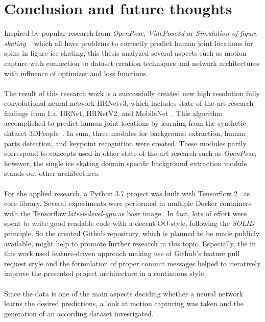 \chapter{Conclusion and future thoughts}
\label{conclusion}
Inspired by popular research from \textit{OpenPose, VidePose3d} or \textit{Simulation of figure skating} ~\cite{openpose, videopose3d, figureskatingsimulation}
which all have problems to correctly predict human joint locations for spins in figure ice skating, this thesis analyzed
several aspects such as motion capture with connection to dataset creation techniques and network architectures with influence of optimizer and loss functions.
\\\mbox{}\\
The result of this research work is a successfully created new high resolution fully convolutional neural network
HRNetv3, which includes state-of-the-art
research findings from I.a. HRNet, HRNetV2, and MobileNet~\cite{HRNetv1, HRNetv2, mobilenet}.
This algorithm accomplished to predict human joint locations by learning from the synthetic dataset
3DPeople~\cite{3dpeople}.
In sum, three modules for background extraction, human parts detection, and keypoint recognition were created.
These modules partly correspond to concepts used in other state-of-the-art research such as \textit{OpenPose},
however, the
single ice skating domain specific background extraction module stands out other architectures.
\\\mbox{}\\
For the applied research, a Python 3.7 project was built with Tensorflow 2~\cite{tensorflow2} as core library.
Several experiments were performed in multiple Docker containers with the Tensorflow:\textit{latest-devel-gpu} as base
image~\cite{tensorflowdocker}
In fact, lots of effort were spent to write good readable code with a decent OO-style, following the \textit{SOLID}
principle.
So the created Github repository, which is planned to be made publicly available, might help to promote further
research in this topic.
Especially, the in this work used feature-driven approach making use of Github's feature pull request style and the
formulation of proper
commit messages helped to iteratively improve the presented project architecture in a continuous style.
\\\mbox{}\\
Since the data is one of the main aspects deciding whether a neural network learns the desired predictions, a look at
motion capturing was taken and the generation of an according dataset investigated.
